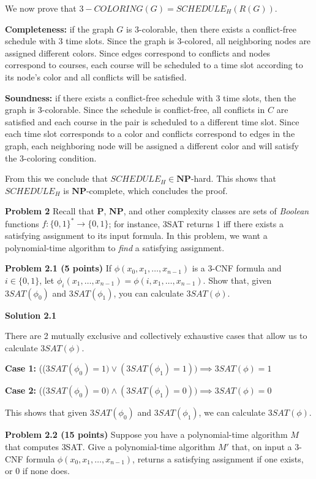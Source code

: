 \documentclass[11pt]{article}
\begin{document}
We now prove that $3-COLORING(G) = SCHEDULE_H(R(G))$.

\textbf{Completeness:} if the graph $G$ is 3-colorable, then there exists a conflict-free schedule with 3 time slots. Since the graph is 3-colored, all neighboring nodes are assigned different colors. Since edges correspond to conflicts and nodes correspond to courses, each course will be scheduled to a time slot according to its node's color and all conflicts will be satisfied. 

\textbf{Soundness:} if there exists a conflict-free schedule with 3 time slots, then the graph is 3-colorable. Since the schedule is conflict-free, all conflicts in $C$ are satisfied and each course in the pair is scheduled to a different time slot. Since each time slot corresponds to a color and conflicts correspond to edges in the graph, each neighboring node will be assigned a different color and will satisfy the 3-coloring condition.

From this we conclude that $SCHEDULE_H \in \mathbf{NP}$-hard. This shows that \(SCHEDULE_H\) is \(\mathbf{NP}\)-complete, which concludes the proof.

\newpage

\textbf{Problem 2} Recall that $\mathbf{P}$, $\mathbf{NP}$, and other complexity classes are sets of \emph{Boolean} functions $f: \{0,1\}^* \to \{0,1\}$; for instance, 3SAT returns 1 iff there exists a satisfying assignment to its input formula. In this problem, we want a polynomial-time algorithm to \emph{find} a satisfying assignment.

\textbf{Problem 2.1 (5 points)} If $\phi(x_0, x_1, \ldots, x_{n-1})$ is a 3-CNF formula and $i \in \{0,1\}$, let $\phi_i(x_1, \ldots, x_{n-1}) = \phi(i,x_1, \ldots, x_{n-1})$. Show that, given $3SAT(\phi_0)$ and $3SAT(\phi_1)$, you can calculate $3SAT(\phi)$.

\textbf{Solution 2.1}

There are 2 mutually exclusive and collectively exhaustive cases that allow us to calculate $3SAT(\phi)$.

\textbf{Case 1:} (($3SAT(\phi_0) = 1) \lor (3SAT(\phi_1) = 1)) \implies 3SAT(\phi) = 1$

\textbf{Case 2:} (($3SAT(\phi_0) = 0) \land (3SAT(\phi_1) = 0)) \implies 3SAT(\phi) = 0$

This shows that given $3SAT(\phi_0)$ and $3SAT(\phi_1)$, we can calculate $3SAT(\phi)$.

\newpage


\textbf{Problem 2.2 (15 points)} Suppose you have a polynomial-time algorithm $M$ that computes \textsc{3SAT}. Give a polynomial-time algorithm $M'$ that, on input a 3-CNF formula $\phi(x_0, x_1, \ldots, x_{n-1})$, returns a satisfying assignment if one exists, or 0 if none does.
\end{document}
